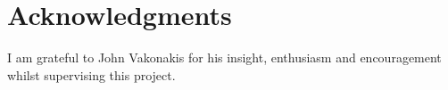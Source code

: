 \documentclass[fleqn,10pt]{article} %
\begin{document}

\section*{Acknowledgments}

I am grateful to John Vakonakis for his insight, enthusiasm and encouragement whilst supervising this project.





\end{document}

